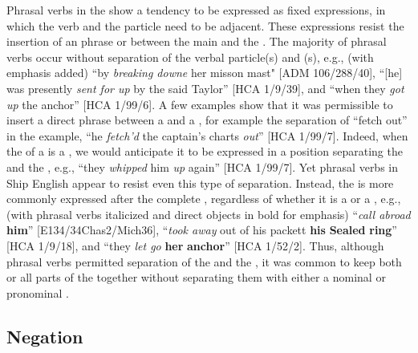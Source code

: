 Phrasal verbs in the  show a tendency to be expressed as fixed expressions, in which the verb and the particle need to be adjacent. These expressions resist the insertion of an  phrase or  between the main  and the . The majority of phrasal verbs occur without separation of the verbal particle(s) and (s), e.g., (with emphasis added) “by \textit{breaking downe} her misson mast" [ADM 106/288/40], “[he] was presently \textit{sent for up} by the said Taylor” [HCA 1/9/39], and “when they \textit{got up} the anchor” [HCA 1/99/6]. A few examples show that it was permissible to insert a direct  phrase between a  and a , for example the separation of “fetch out” in the example, “he \textit{fetch’d} the captain’s charts \textit{out}” [HCA 1/99/7]. Indeed, when the  of a   is a , we would anticipate it to be expressed in a position separating the  and the , e.g., “they \textit{whipped} him \textit{up} again” [HCA 1/99/7]. Yet phrasal verbs in Ship English appear to resist even this type of separation. Instead, the  is more commonly expressed after the complete , regardless of whether it is a  or a , e.g., (with phrasal verbs italicized and direct objects in bold for emphasis) “\textit{call abroad} \textbf{him}” [E134/34Chas2/Mich36], “\textit{took away} out of his packett \textbf{his} \textbf{Sealed} \textbf{ring}” [HCA 1/9/18], and “they \textit{let go} \textbf{her} \textbf{anchor}” [HCA 1/52/2]. Thus, although phrasal verbs permitted separation of the  and the , it was common to keep both or all parts of the  together without separating them with either a nominal or pronominal . 

\subsection{{Negation}}\label{sec:6.1.3}


